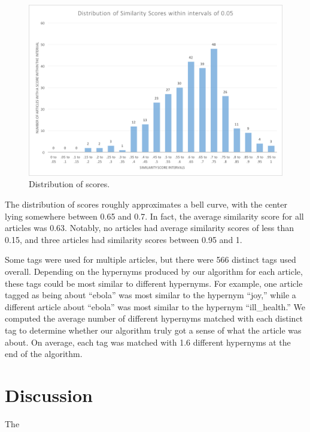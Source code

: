 \documentclass[11pt]{article}
\begin{document}
\begin{figure}[t]
\centering
\includegraphics[width=\textwidth]{../scoreHist.png}
\caption{Distribution of scores.}
\label{scoreHist}
\end{figure}

The distribution of scores roughly approximates a bell curve, with the center lying somewhere between 0.65 and 0.7. In fact, the average similarity score for all articles was 0.63. Notably, no articles had average similarity scores of less than 0.15, and three articles had similarity scores between 0.95 and 1.

Some tags were used for multiple articles, but there were 566 distinct tags used overall. Depending on the hypernyms produced by our algorithm for each article, these tags could be most similar to different hypernyms. For example, one article tagged as being about ``ebola'' was most similar to the hypernym ``joy,'' while a different article about ``ebola'' was most similar to the hypernym ``ill\_health.'' We computed the average number of different hypernyms matched with each distinct tag to determine whether our algorithm truly got a sense of what the article was about. On average, each tag was matched with 1.6 different hypernyms at the end of the algorithm.

\section{Discussion}

The 


%
%


\end{document}
